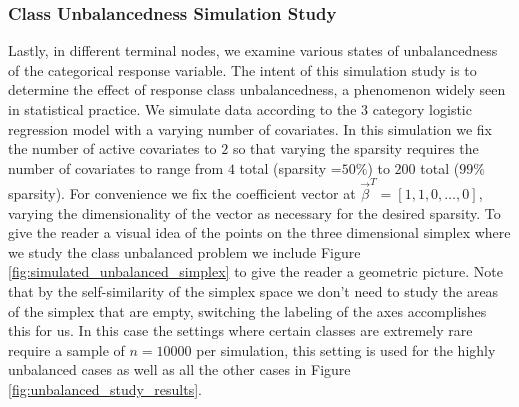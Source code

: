 \subsubsection{Class Unbalancedness Simulation Study}
Lastly, in different terminal nodes, we examine various states of unbalancedness of the categorical response variable. The intent of this simulation study is to determine the effect of response class unbalancedness, a phenomenon widely seen in statistical practice. We simulate data according to the $3$ category logistic regression model with a varying number of covariates. In this simulation we fix the number of active covariates to $2$ so that varying the sparsity requires the number of covariates to range from $4$ total (sparsity =$50\%$) to $200$ total ($99\%$ sparsity). For convenience we fix the coefficient vector at $\vec{\beta}^T =[1,1,0,\dots, 0]$, varying the dimensionality of the vector as necessary for the desired sparsity. To give the reader a visual idea of the points on the three dimensional simplex where we study the class unbalanced problem we include Figure \ref{fig:simulated_unbalanced_simplex} to give the reader a geometric picture. Note that by the self-similarity of the simplex space we don't need to study the areas of the simplex that are empty, switching the labeling of the axes accomplishes this for us. In this case the settings where certain classes are extremely rare require a sample of $n=10000$ per simulation, this setting is used for the highly unbalanced cases as well as all the other cases in Figure \ref{fig:unbalanced_study_results}.



